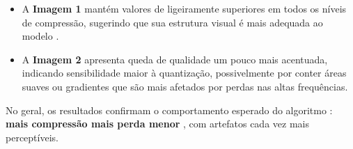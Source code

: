 \documentclass[../main.tex]{subfiles}
\begin{document}
\begin{itemize}
    \item A \textbf{Imagem 1} mantém valores de \psnr{} ligeiramente superiores em todos os níveis de compressão, sugerindo que sua estrutura visual é mais adequada ao modelo \jpeg\@.

    \item A \textbf{Imagem 2} apresenta queda de qualidade um pouco mais acentuada, indicando sensibilidade maior à quantização, possivelmente por conter áreas suaves ou gradientes que são mais afetados por perdas nas altas frequências.
\end{itemize}

No geral, os resultados confirmam o comportamento esperado do algoritmo \jpeg\@: \textbf{mais compressão \rightarrow{} mais perda \rightarrow{} menor \psnr{}}, com artefatos cada vez mais perceptíveis.
\end{document}
